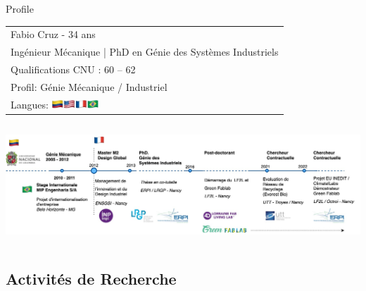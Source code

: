 \documentclass[
  11pt,
  ignorenonframetext,
  aspectratio=169,
  c]{beamer}
\begin{document}
\begin{frame}[t]{Profile}
\protect\hypertarget{profile}{}
\extrarowsep=-1.5pt
\begin{tabu} to 
Fabio Cruz - 34 ans   \\
Ingénieur Mécanique | PhD en Génie des Systèmes Industriels \\
Qualifications CNU : 60 – 62 \\
Profil:  Génie Mécanique / Industriel\\
Langues: \includegraphics[width=50pt]{Figures/slides/Langues.jpg}


\end{tabu}

\begin{columns}[T]
\begin{column}[c]{1\textwidth}
\includegraphics{Figures/slides/Fabio-timeline-Parcours.jpg}
\end{column}
\end{columns}

\note{}
\end{frame}

\hypertarget{activituxe9s-de-recherche}{%
\subsection{Activités de Recherche}\label{activituxe9s-de-recherche}}
\end{document}
